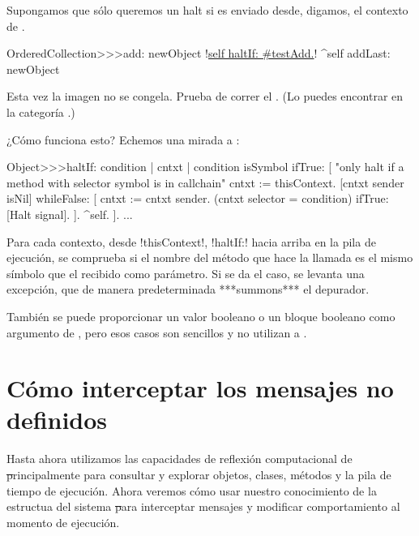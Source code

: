 \documentclass[a4paper,10pt,twoside]{book}
\begin{document}
Supongamos que sólo queremos un halt si  es enviado desde,
digamos, el contexto de .

\begin{code}{}
OrderedCollection>>>add: newObject
        !\underline{self haltIf: \#testAdd.}!
        ^self addLast: newObject
\end{code}

Esta vez la imagen no se congela.  Prueba de correr el
.  (Lo puedes encontrar en la categoría
.) 

¿Cómo funciona esto?  Echemos una mirada a
: 
\begin{code}{}
Object>>>haltIf: condition
        | cntxt |
        condition isSymbol ifTrue: [
                "only halt if a method with selector symbol is in callchain"
                cntxt := thisContext.
                [cntxt sender isNil] whileFalse: [
                        cntxt := cntxt sender.
                        (cntxt selector = condition) ifTrue: [Halt signal]. ].
                ^self.
        ].
        ...
\end{code}

Para cada contexto, desde \ct!thisContext!, \ct!haltIf:! hacia arriba
en la pila de ejecución, se comprueba si el nombre del método que hace
la llamada es el mismo símbolo que el recibido como parámetro.  Si se
da el caso, se levanta una excepción, que de manera predeterminada
***summons*** el depurador.

También se puede proporcionar un valor booleano o un bloque booleano
como argumento de , pero esos casos son sencillos y no
utilizan a .

\section{Cómo interceptar los mensajes no definidos}

Hasta ahora utilizamos las capacidades de reflexión computacional de
\st principalmente para consultar y explorar objetos, clases, métodos
y la pila de tiempo de ejecución.  Ahora veremos cómo usar nuestro
conocimiento de la estructua del sistema \st para interceptar mensajes
y modificar comportamiento al momento de ejecución.
\end{document}
